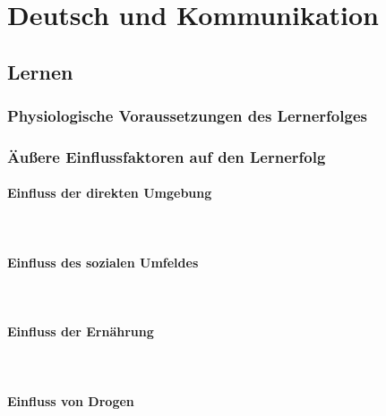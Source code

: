 \section{Deutsch und Kommunikation}

\subsection{Lernen}

\subsubsection{Physiologische Voraussetzungen des Lernerfolges}

\subsubsection{Äußere Einflussfaktoren auf den Lernerfolg}
\paragraph{Einfluss der direkten Umgebung}~\\
\paragraph{Einfluss des sozialen Umfeldes}~\\
\paragraph{Einfluss der Ernährung}~\\
\paragraph{Einfluss von Drogen}~\\
